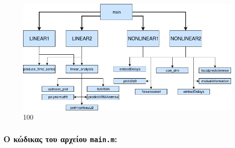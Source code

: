 \documentclass[11pt,]{article}
\begin{document}
\begin{figure}
\centering
\includegraphics{project_struct.png}
\caption{100}
\end{figure}

\hypertarget{ux3bf-ux3baux3ceux3b4ux3b9ux3baux3b1ux3c2-ux3c4ux3bfux3c5-ux3b1ux3c1ux3c7ux3b5ux3afux3bfux3c5-main.m}{%
\subsubsection{\texorpdfstring{Ο κώδικας του αρχείου
\texttt{main.m}:}{Ο κώδικας του αρχείου main.m:}}\label{ux3bf-ux3baux3ceux3b4ux3b9ux3baux3b1ux3c2-ux3c4ux3bfux3c5-ux3b1ux3c1ux3c7ux3b5ux3afux3bfux3c5-main.m}}
\end{document}
